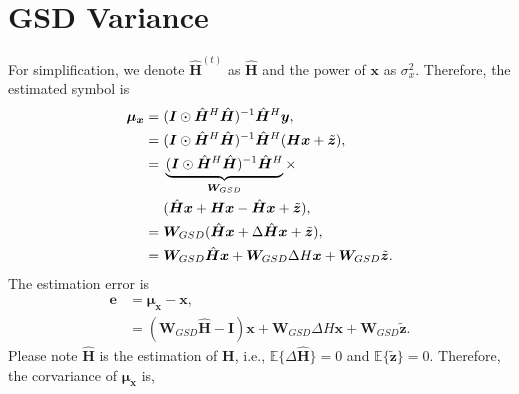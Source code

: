 \documentclass[journal]{IEEEtran}
\begin{document}
\section{GSD Variance} \label{app:GSD}
For simplification, we denote $\hat{\bm H}^{(t)}$ as $ \hat{\bm H}$ and the power of $\bm x$ as $\sigma_x^2$. Therefore, the estimated symbol is
\begin{equation}
\begin{split}
\boldsymbol{\mu}_{\boldsymbol{x}} = \hspace{0.3em}& (\boldsymbol{I}\odot\hat{\boldsymbol{H}}^H \hat{\boldsymbol{H}})^{-1}\hat{\boldsymbol{H}}^H\boldsymbol{y}, \\
= \hspace{0.3em}& (\boldsymbol{I}\odot\hat{\boldsymbol{H}}^H \hat{\boldsymbol{H}})^{-1}\hat{\boldsymbol{H}}^H(\boldsymbol{H} \boldsymbol{x} + \tilde{\boldsymbol{z}}), \\
= \hspace{0.3em}& \underbrace{(\boldsymbol{I}\odot\hat{\boldsymbol{H}}^H \hat{\boldsymbol{H}})^{-1}\hat{\boldsymbol{H}}^H}_{{\boldsymbol{W}}_{GSD}} \times \\
& (\hat{\boldsymbol{H}} \boldsymbol{x} + \boldsymbol{H} \boldsymbol{x} - \hat{\boldsymbol{H}} \boldsymbol{x} + \tilde{\boldsymbol{z}}), \\
= \hspace{0.3em} & {\boldsymbol{W}}_{GSD} (\hat{\boldsymbol{H}} \boldsymbol{x} + \Delta\hat{\boldsymbol{H}} \boldsymbol{x} + \tilde{\boldsymbol{z}}), \\
= \hspace{0.3em} & {\boldsymbol{W}}_{GSD}\hat{\boldsymbol{H}} \boldsymbol{x} + {\boldsymbol{W}}_{GSD}\Delta H\boldsymbol{x} +  {\boldsymbol{W}}_{GSD}\tilde{\boldsymbol{z}}.
\end{split}
\end{equation}
The estimation error is
\begin{equation}
\begin{split}
\bm e &= \bm {\mu}_{\bm x} - \bm x, \\
&= ({\bm W}_{GSD}\hat{\bm H} - \bm I) \bm x + {\bm W}_{GSD}\Delta H\bm x + {\bm W}_{GSD}\tilde{\bm z}.
\end{split}
\end{equation}
Please note $\hat{\bm H}$ is the estimation of $\bm H$, i.e., $\mathbb{E}\{\Delta\hat{\bm H} \}=0$ and $\mathbb{E}\{ \tilde{\bm z}\}=0$. Therefore, the corvariance of $\bm {\mu}_{\bm x}$ is,
\end{document}

